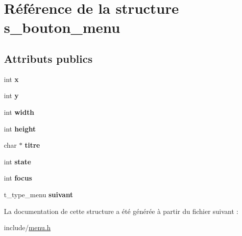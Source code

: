 \hypertarget{structs__bouton__menu}{}\section{Référence de la structure s\+\_\+bouton\+\_\+menu}
\label{structs__bouton__menu}
\subsection*{Attributs publics}
\begin{DoxyCompactItemize}
\item 
\mbox{\label{structs__bouton__menu_a9c3f6f6be6b0158a9a8c4a1c20665db6}} 
int {\bfseries x}
\item 
\mbox{\label{structs__bouton__menu_ada7d8855acb0aed9f19b7391aec1d7f8}} 
int {\bfseries y}
\item 
\mbox{\label{structs__bouton__menu_a759777359e5e76e39505d2d49d405906}} 
int {\bfseries width}
\item 
\mbox{\label{structs__bouton__menu_a0cd163542f7a5bb70582dab50a787ae9}} 
int {\bfseries height}
\item 
\mbox{\label{structs__bouton__menu_a6c37187d85823c83a30508ddf1605619}} 
char $\ast$ {\bfseries titre}
\item 
\mbox{\label{structs__bouton__menu_a03995d4bf640696693dc738193ca0d92}} 
int {\bfseries state}
\item 
\mbox{\label{structs__bouton__menu_a3d3e80d0cd08aecec3445afb87d42291}} 
int {\bfseries focus}
\item 
\mbox{\label{structs__bouton__menu_ac0c499287ef689b8035ab6a6616f3ec5}} 
t\+\_\+type\+\_\+menu {\bfseries suivant}
\end{DoxyCompactItemize}


La documentation de cette structure a été générée à partir du fichier suivant \+:\begin{DoxyCompactItemize}
\item 
include/\hyperlink{menu_8h}{menu.\+h}\end{DoxyCompactItemize}
